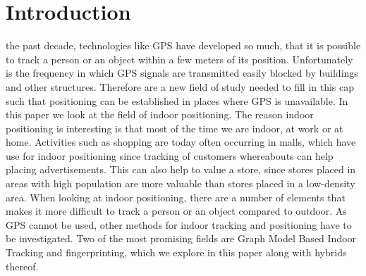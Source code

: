 \section{Introduction}
 the past decade, technologies like GPS have developed so much, that it is possible to track a person or an object within a few meters of its position. 
Unfortunately is the frequency in which GPS signals are transmitted easily blocked by buildings and other structures. 
Therefore are a new field of study needed to fill in this cap such that positioning can be established in places where GPS is unavailable.
In this paper we look at the field of indoor positioning. 
The reason indoor positioning is interesting is that most of the time we are indoor, at work or at home. 
Activities such as shopping are today often occurring in malls, which have use for indoor positioning since tracking of customers whereabouts can help placing advertisements. 
This can also help to value a store, since stores placed in areas with high population are more valuable than stores placed in a low-density area.
When looking at indoor positioning, there are a number of elements that makes it more difficult to track a person or an object compared to outdoor.
As GPS cannot be used, other methods for indoor tracking and positioning have to be investigated. 
Two of the most promising fields are Graph Model Based Indoor Tracking and fingerprinting, which we explore in this paper along with hybrids thereof. 




